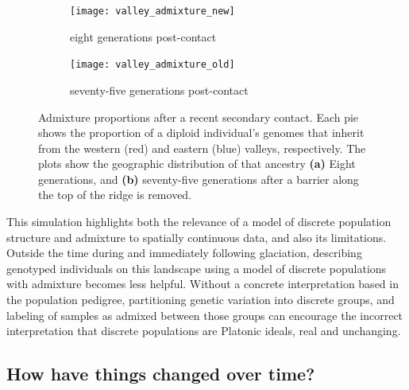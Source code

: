 \documentclass{ar-1col}
\begin{document}
\begin{figure}	%
    \centering
    	\begin{subfigure}{0.85\textwidth}
		\centering
        		\texttt{[image: valley\_admixture\_new]}
	        \caption{eight generations post-contact}
	        \label{8gen}
    	\end{subfigure}
    	\begin{subfigure}{0.85\textwidth}
		\centering
	        \texttt{[image: valley\_admixture\_old]}
	        \caption{seventy-five generations post-contact}
	        \label{75gen}
    	\end{subfigure}
        \caption{
            Admixture proportions after a recent secondary contact.
            Each pie shows the proportion of a diploid individual's genomes
            that inherit from the western (red) and eastern (blue) valleys, respectively.
            The plots show the geographic distribution of that ancestry 
            \textbf{(a)} Eight generations, and
            \textbf{(b)} seventy-five generations 
            after a barrier along the top of the ridge is removed.
        }
        \label{postglacial_expansion}
\end{figure}

This simulation highlights both the relevance of 
a model of discrete population structure and admixture
to spatially continuous data, 
and also its limitations.
Outside the time during and immediately following glaciation, 
describing genotyped individuals on this landscape 
using a model of discrete populations with admixture 
becomes less helpful.
Without a concrete interpretation based in the population pedigree,
partitioning genetic variation into discrete groups, 
and labeling of samples as admixed between those groups
can encourage the incorrect interpretation that discrete populations are Platonic ideals,
real and unchanging.

\subsection{How have things changed over time?}
\end{document}
